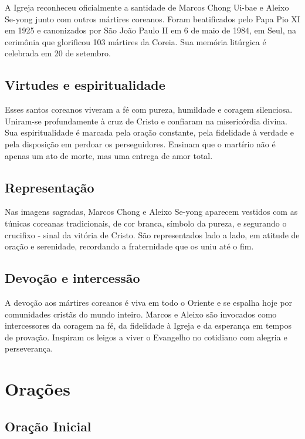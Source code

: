 \documentclass[a4paper,14pt]{extarticle} \usepackage[utf8]{inputenc}
\begin{document}
 A Igreja reconheceu oficialmente a santidade de Marcos Chong Ui-bae e Aleixo Se-yong junto com outros mártires coreanos. Foram beatificados pelo Papa Pio XI em 1925 e canonizados por São João Paulo II em 6 de maio de 1984, em Seul, na cerimônia que glorificou 103 mártires da Coreia. Sua memória litúrgica é celebrada em 20 de setembro.

 \subsection{Virtudes e espiritualidade}

 Esses santos coreanos viveram a fé com pureza, humildade e coragem silenciosa. Uniram-se profundamente à cruz de Cristo e confiaram na misericórdia divina. Sua espiritualidade é marcada pela oração constante, pela fidelidade à verdade e pela disposição em perdoar os perseguidores. Ensinam que o martírio não é apenas um ato de morte, mas uma entrega de amor total.

 \subsection{Representação}

 Nas imagens sagradas, Marcos Chong e Aleixo Se-yong aparecem vestidos com as túnicas coreanas tradicionais, de cor branca, símbolo da pureza, e segurando o crucifixo - sinal da vitória de Cristo. São representados lado a lado, em atitude de oração e serenidade, recordando a fraternidade que os uniu até o fim.

 \subsection{Devoção e intercessão}

 A devoção aos mártires coreanos é viva em todo o Oriente e se espalha hoje por comunidades cristãs do mundo inteiro. Marcos e Aleixo são invocados como intercessores da coragem na fé, da fidelidade à Igreja e da esperança em tempos de provação. Inspiram os leigos a viver o Evangelho no cotidiano com alegria e perseverança.

\newpage

\vfill

\section{Orações}
\subsection{Oração Inicial}\label{sub:inicial} %
\end{document}
